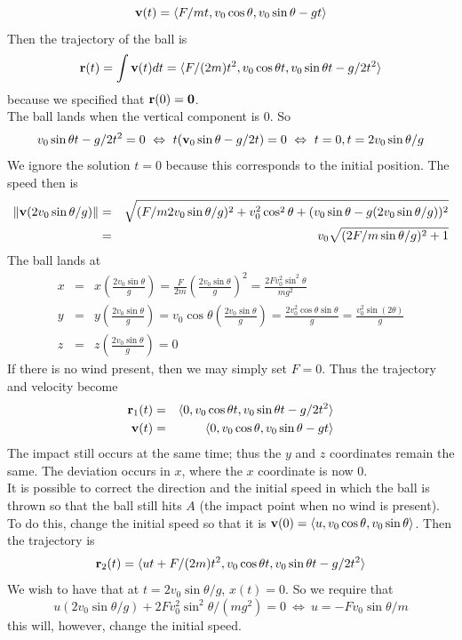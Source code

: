 \documentclass[12pt]{amsbook}
\newcommand{\la}{\langle}
\newcommand{\ra}{\rangle}
\begin{document}
$${\bf v}(t)=\la F/m t, v_0\cos \theta, v_0\sin \theta -gt \ra$$
Then the trajectory of the ball is
$${\bf r}(t)=\int {\bf v}(t)dt=\la F/(2m)t^2, v_0\cos \theta t, v_0\sin \theta t -g/2t^2 \ra$$
because we specified that ${\bf r}(0)={\bf 0}$. 
\\
The ball lands when the vertical component is $0$. So 
$$v_0\sin \theta t -g/2t^2=0 \ \Leftrightarrow \ t({\bf v}_0\sin \theta -g/2t)=0 \ \Leftrightarrow \ t=0, t=2v_0\sin \theta /g$$
We ignore the solution $t=0$ because this corresponds to the initial position. The speed then is
\begin{eqnarray*}
\|{\bf v}(2v_0\sin \theta /g)\|&=&\sqrt{(F/m 2v_0\sin \theta /g)^2+v_0^2\cos^2\theta+(v_0\sin \theta -g (2v_0\sin \theta /g))^2}\\
&=&v_0\sqrt{(2F/m\sin\theta/g)^2+1}
\end{eqnarray*}
The ball lands at 
\begin{eqnarray*}
x&=&x(\frac{2v_0\sin \theta}{g})=\frac{F}{2m}(\frac{2v_0\sin \theta}{g})^2=\frac{2Fv_0^2\sin^2\theta}{mg^2}\\
y&=&y(\frac{2v_0\sin \theta}{g})=v_0\cos \theta(\frac{2v_0\sin \theta}{g})=\frac{2v_0^2\cos\theta \sin\theta}{g}=\frac{v_0^2\sin(2\theta)}{g}\\
z&=&z(\frac{2v_0\sin \theta}{g})=0
\end{eqnarray*}
If there is no wind present, then we may simply set $F=0$. Thus the trajectory and velocity become
\begin{eqnarray*}
{\bf r}_1(t)&=&\la 0, v_0\cos \theta t, v_0\sin \theta t -g/2t^2 \ra \\
{\bf v}(t)&=&\la 0, v_0\cos \theta, v_0\sin \theta -gt \ra
\end{eqnarray*}
The impact still occurs at the same time; thus the $y$ and $z$ coordinates remain the same. The deviation occurs in $x$, where the $x$ coordinate is now $0$. 
\\
It is possible to correct the direction and the initial speed in which the ball is
thrown so that the ball still hits $A$ (the impact point when no wind is present). To do this, change the initial speed so that it is ${\bf v}(0)=\la u, v_0\cos \theta, v_0\sin \theta \ra$. Then the trajectory is
$${\bf r}_2(t)=\la ut+F/(2m)t^2, v_0\cos \theta t, v_0\sin \theta t -g/2t^2 \ra$$
We wish to have that at $t=2v_0\sin \theta /g$, $x(t)=0$. So we require that
$$u(2v_0\sin \theta /g)+2Fv_0^2\sin^2\theta/(mg^2)=0  \ \Leftrightarrow \ u=-Fv_0\sin\theta/m$$
this will, however, change the initial speed. 
\\
\end{document}
